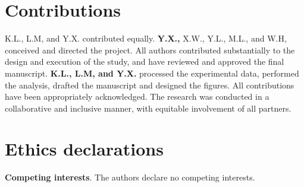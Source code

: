 \documentclass[preprint,12pt]{elsarticle}
\theoremstyle{plain}
\theoremstyle{definition}
\theoremstyle{remark}
\begin{document}
\section*{Contributions}

K.L., L.M, and Y.X. contributed equally. \textbf{Y.X.,} X.W., Y.L., M.L., and W.H, conceived and directed the project. All authors contributed substantially to the design and execution of the study, and have reviewed and approved the final manuscript. \textbf{K.L., L.M, and Y.X.} processed the experimental data, performed the analysis, drafted the manuscript and designed the figures.  All contributions have been appropriately acknowledged. The research was conducted in a collaborative and inclusive manner, with equitable involvement of all partners.

\section*{Ethics declarations}

\textbf{Competing interests}. The authors declare no competing interests.














\end{document}
